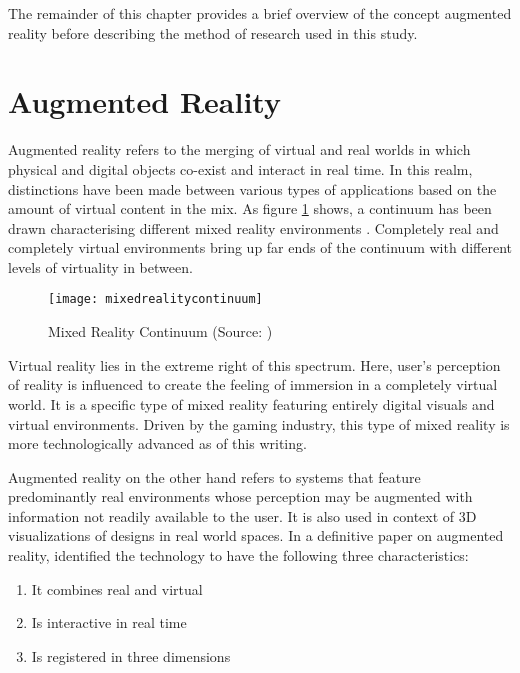 The remainder of this chapter provides a brief overview of the concept augmented reality before describing the method of research used in this study.

\section{Augmented Reality}
\label{sec:augreal}
Augmented reality refers to the merging of virtual and real worlds in which physical and digital objects co-exist and interact in real time. In this realm, distinctions have been made between various types of applications based on the amount of virtual content in the mix. As figure \ref{fig:mixedrealitycontinuum} shows, a continuum has been drawn characterising different mixed reality environments \cite{milgram1995augmented}. Completely real and completely virtual environments bring up far ends of the continuum with different levels of virtuality in between. 

\begin{figure}
	\centering
	\texttt{[image: mixedrealitycontinuum]}
	\caption{Mixed Reality Continuum (Source: \cite{milgram1995augmented})}
	\label{fig:mixedrealitycontinuum}
\end{figure}

Virtual reality lies in the extreme right of this spectrum. Here, user's perception of reality is influenced to create the feeling of immersion in a completely virtual world. It is a specific type of mixed reality featuring entirely digital visuals and virtual environments. Driven by the gaming industry, this type of mixed reality is more technologically advanced as of this writing.

Augmented reality on the other hand refers to systems that feature predominantly real environments whose perception may be augmented with information not readily available to the user. It is also used in context of 3D visualizations of designs in real world spaces. In a definitive paper on augmented reality, \textcite{azuma1997survey} identified the technology to have the following three characteristics: 
\begin{enumerate}
	\item It combines real and virtual 
	\item Is interactive in real time
	\item Is registered in three dimensions
\end{enumerate} 



